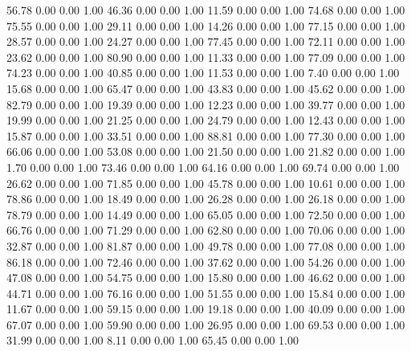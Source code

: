    56.78   0.00   0.00   1.00
   46.36   0.00   0.00   1.00
   11.59   0.00   0.00   1.00
   74.68   0.00   0.00   1.00
   75.55   0.00   0.00   1.00
   29.11   0.00   0.00   1.00
   14.26   0.00   0.00   1.00
   77.15   0.00   0.00   1.00
   28.57   0.00   0.00   1.00
   24.27   0.00   0.00   1.00
   77.45   0.00   0.00   1.00
   72.11   0.00   0.00   1.00
   23.62   0.00   0.00   1.00
   80.90   0.00   0.00   1.00
   11.33   0.00   0.00   1.00
   77.09   0.00   0.00   1.00
   74.23   0.00   0.00   1.00
   40.85   0.00   0.00   1.00
   11.53   0.00   0.00   1.00
    7.40   0.00   0.00   1.00
   15.68   0.00   0.00   1.00
   65.47   0.00   0.00   1.00
   43.83   0.00   0.00   1.00
   45.62   0.00   0.00   1.00
   82.79   0.00   0.00   1.00
   19.39   0.00   0.00   1.00
   12.23   0.00   0.00   1.00
   39.77   0.00   0.00   1.00
   19.99   0.00   0.00   1.00
   21.25   0.00   0.00   1.00
   24.79   0.00   0.00   1.00
   12.43   0.00   0.00   1.00
   15.87   0.00   0.00   1.00
   33.51   0.00   0.00   1.00
   88.81   0.00   0.00   1.00
   77.30   0.00   0.00   1.00
   66.06   0.00   0.00   1.00
   53.08   0.00   0.00   1.00
   21.50   0.00   0.00   1.00
   21.82   0.00   0.00   1.00
    1.70   0.00   0.00   1.00
   73.46   0.00   0.00   1.00
   64.16   0.00   0.00   1.00
   69.74   0.00   0.00   1.00
   26.62   0.00   0.00   1.00
   71.85   0.00   0.00   1.00
   45.78   0.00   0.00   1.00
   10.61   0.00   0.00   1.00
   78.86   0.00   0.00   1.00
   18.49   0.00   0.00   1.00
   26.28   0.00   0.00   1.00
   26.18   0.00   0.00   1.00
   78.79   0.00   0.00   1.00
   14.49   0.00   0.00   1.00
   65.05   0.00   0.00   1.00
   72.50   0.00   0.00   1.00
   66.76   0.00   0.00   1.00
   71.29   0.00   0.00   1.00
   62.80   0.00   0.00   1.00
   70.06   0.00   0.00   1.00
   32.87   0.00   0.00   1.00
   81.87   0.00   0.00   1.00
   49.78   0.00   0.00   1.00
   77.08   0.00   0.00   1.00
   86.18   0.00   0.00   1.00
   72.46   0.00   0.00   1.00
   37.62   0.00   0.00   1.00
   54.26   0.00   0.00   1.00
   47.08   0.00   0.00   1.00
   54.75   0.00   0.00   1.00
   15.80   0.00   0.00   1.00
   46.62   0.00   0.00   1.00
   44.71   0.00   0.00   1.00
   76.16   0.00   0.00   1.00
   51.55   0.00   0.00   1.00
   15.84   0.00   0.00   1.00
   11.67   0.00   0.00   1.00
   59.15   0.00   0.00   1.00
   19.18   0.00   0.00   1.00
   40.09   0.00   0.00   1.00
   67.07   0.00   0.00   1.00
   59.90   0.00   0.00   1.00
   26.95   0.00   0.00   1.00
   69.53   0.00   0.00   1.00
   31.99   0.00   0.00   1.00
    8.11   0.00   0.00   1.00
   65.45   0.00   0.00   1.00
